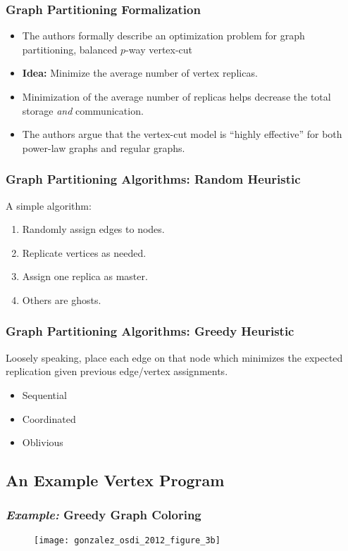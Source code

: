 \begin{frame}
  \frametitle{Graph Partitioning Formalization}
  \begin{itemize}
    \item The authors formally describe an optimization problem for graph
          partitioning, balanced $p$-way vertex-cut
    \item \textbf{Idea:} Minimize the average number of vertex replicas.
    \item Minimization of the average number of replicas helps decrease the
          total storage \textit{and} communication.
    \item The authors argue that the vertex-cut model is ``highly effective''
          for both power-law graphs and regular graphs.~\cite[OSDI '12]{gonzalez2012powergraph}
  \end{itemize}
\end{frame}

\begin{frame}
  \frametitle{Graph Partitioning Algorithms: Random Heuristic}
  A simple algorithm:
  \begin{enumerate}
    \item Randomly assign edges to nodes.
    \item Replicate vertices as needed.
    \item Assign one replica as master.
    \item Others are ghosts.
  \end{enumerate}
\end{frame}

\begin{frame}
  \frametitle{Graph Partitioning Algorithms: Greedy Heuristic}
  Loosely speaking, place each edge on that node which minimizes the expected
  replication given previous edge/vertex assignments.
  \begin{itemize}
    \item Sequential
    \item Coordinated
    \item Oblivious
  \end{itemize}
\end{frame}


\subsection{An Example Vertex Program}

\begin{frame}
  \frametitle{\textit{Example:} Greedy Graph Coloring}
  \begin{figure}
    \centering
    \texttt{[image: gonzalez\_osdi\_2012\_figure\_3b]}
    \caption{\cite[OSDI '12]{gonzalez2012powergraph}}
  \end{figure}
\end{frame}


